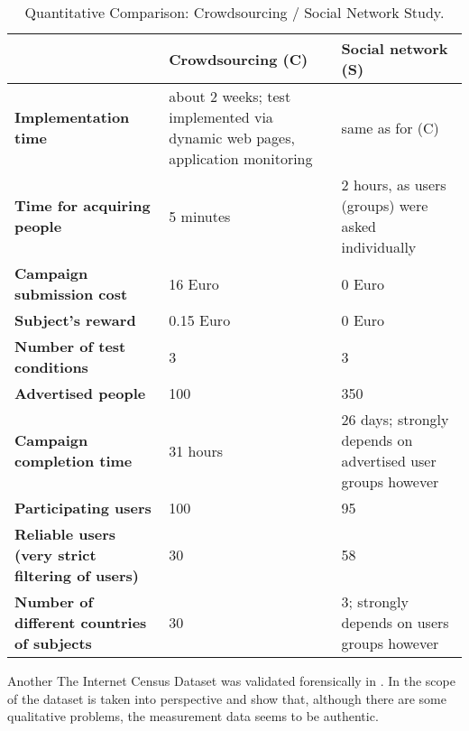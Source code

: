 \begin{table}[tb]
\caption{Quantitative Comparison: Crowdsourcing / Social Network Study.} \label{tab:CvsS}
\begin{center}
{\footnotesize
	\begin{tabular}{|p{}|p{}|p{}|} \hline
		\textbf{} & \textbf{Crowdsourcing (C)} & \textbf{Social network (S)} \\ \hline
		\textbf{Implementation time} & about 2 weeks; test implemented via dynamic web pages, application monitoring & same as for (C) \\ \hline
		\textbf{Time for acquiring people} & 5 minutes & 2 hours, as users (groups) were asked individually \\ \hline
		\textbf{Campaign submission cost} & 16 Euro & 0 Euro \\ \hline
		\textbf{Subject’s reward} & 0.15 Euro & 0 Euro \\ \hline
		\textbf{Number of test conditions} & 3 & 3 \\ \hline
		\textbf{Advertised  people} & 100 & 350 \\ \hline
		\textbf{Campaign completion time} & 31 hours & 26 days; strongly depends on advertised user groups however \\ \hline
		\textbf{Participating users} & 100 & 95 \\ \hline
		\textbf{Reliable users (very strict filtering of users)} & 30 & 58 \\ \hline
		\textbf{Number of different countries of subjects} & 30 & 3; strongly depends on users groups however \\ \hline
		\end{tabular}
}
\end{center}
\end{table}

Another 
The Internet Census Dataset was validated forensically in \cite{dainotticaida}.
In \cite{krenc2014internet} the scope of the dataset is taken into perspective and show that, although there are some qualitative problems, the measurement data seems to be authentic.

